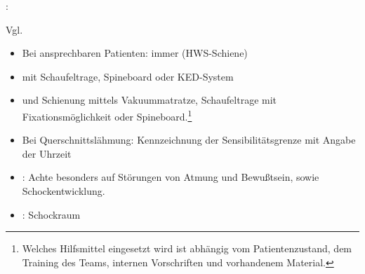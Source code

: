 \label{m:ws-trauma}
: 


Vgl. 
\begin{itemize}
  \item Bei ansprechbaren Patienten: immer
   (HWS-Schiene)
  \item {} mit Schaufeltrage, Spineboard oder
  KED-System
  \item {} und Schienung mittels
  Vakuummatratze, Schaufeltrage mit Fixationsmöglichkeit oder
  Spineboard.\footnote{Welches Hilfsmittel
  eingesetzt wird ist abhängig vom Patientenzustand,
  dem Training des Teams, internen Vorschriften und
  vorhandenem Material.}
  \item Bei Querschnittslähmung: Kennzeichnung der
  Sensibilitätsgrenze mit Angabe der Uhrzeit
  \item {}: Achte besonders auf Störungen
  von Atmung und Bewußtsein, sowie Schockentwicklung.
  \item {}: Schockraum
\end{itemize}